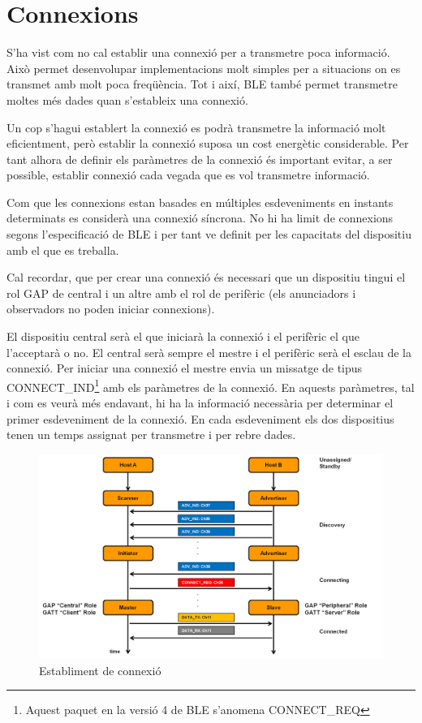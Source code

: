 \section{Connexions}
S'ha vist com no cal establir una connexió per a transmetre poca informació.
Això permet desenvolupar implementacions molt simples per a situacions on es transmet amb molt poca freqüència. Tot i així, BLE també permet transmetre moltes més dades quan s'estableix una connexió.

Un cop s'hagui establert la connexió es podrà transmetre la informació molt eficientment, però establir la connexió suposa un cost energètic considerable.
Per tant alhora de definir els paràmetres de la connexió és important evitar, a ser possible, establir connexió cada vegada que es vol transmetre informació.

Com que les connexions estan basades en múltiples esdeveniments en instants determinats es considerà una connexió síncrona.
No hi ha limit de connexions segons l'especificació de BLE i per tant ve definit per les capacitats del dispositiu amb el que es treballa.

Cal recordar, que per crear una connexió és necessari que un dispositiu tingui el rol GAP de central i un altre amb el rol de perifèric (els anunciadors i observadors no poden iniciar connexions).

El dispositiu central serà el que iniciarà la connexió i el perifèric el que l'acceptarà o no.
El central serà sempre el mestre i el perifèric serà el esclau de la connexió.
Per iniciar una connexió el mestre envia un missatge de tipus CONNECT\_IND\footnote{Aquest paquet en la versió 4 de BLE s'anomena CONNECT\_REQ} amb els paràmetres de la connexió.
En aquests paràmetres, tal i com es veurà més endavant, hi ha la informació necessària per determinar el primer esdeveniment de la connexió.
En cada esdeveniment els dos dispositius tenen un temps assignat per transmetre i per rebre dades.

\begin{figure}[h]
	\begin{center}
		\includegraphics[width=1.2\textwidth]{./images/rols_unicast.png}
		\caption{Establiment de connexió}
		\label{fig:unicast_roles}
	\end{center}
\end{figure}


